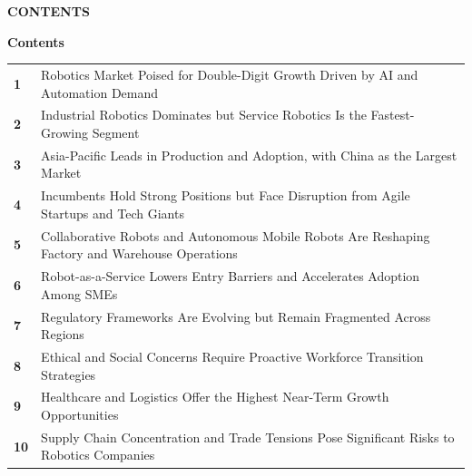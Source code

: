 \documentclass[10pt,a4paper]{article}
\begin{document}
{\textcolor{BOBlue}{\scriptsize\bfseries CONTENTS}}\par\vspace{-1pt}
{\Large\sffamily\bfseries\color{BONavy} Contents}\par\vspace{4pt}
\vspace{2pt}{\color{BOBright}\rule{\linewidth}{1pt}}\vspace{5pt}
\begin{tabularx}{\linewidth}{p{10mm}Y}
\textcolor{BOBlue}{\bfseries 1} & Robotics Market Poised for Double-Digit Growth Driven by AI and Automation Demand \\[5pt]
\textcolor{BOBlue}{\bfseries 2} & Industrial Robotics Dominates but Service Robotics Is the Fastest-Growing Segment \\[5pt]
\textcolor{BOBlue}{\bfseries 3} & Asia-Pacific Leads in Production and Adoption, with China as the Largest Market \\[5pt]
\textcolor{BOBlue}{\bfseries 4} & Incumbents Hold Strong Positions but Face Disruption from Agile Startups and Tech Giants \\[5pt]
\textcolor{BOBlue}{\bfseries 5} & Collaborative Robots and Autonomous Mobile Robots Are Reshaping Factory and Warehouse Operations \\[5pt]
\textcolor{BOBlue}{\bfseries 6} & Robot-as-a-Service Lowers Entry Barriers and Accelerates Adoption Among SMEs \\[5pt]
\textcolor{BOBlue}{\bfseries 7} & Regulatory Frameworks Are Evolving but Remain Fragmented Across Regions \\[5pt]
\textcolor{BOBlue}{\bfseries 8} & Ethical and Social Concerns Require Proactive Workforce Transition Strategies \\[5pt]
\textcolor{BOBlue}{\bfseries 9} & Healthcare and Logistics Offer the Highest Near-Term Growth Opportunities \\[5pt]
\textcolor{BOBlue}{\bfseries 10} & Supply Chain Concentration and Trade Tensions Pose Significant Risks to Robotics Companies \\[5pt]
\end{tabularx}
\clearpage
\end{document}
